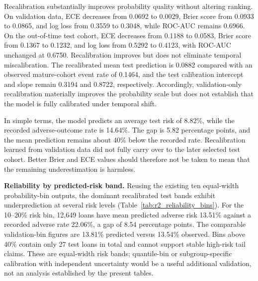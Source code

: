\documentclass[10pt]{article}
\begin{document}
Recalibration substantially improves probability quality without altering ranking. On validation data, ECE decreases from 0.0692 to 0.0029, Brier score from 0.0933 to 0.0865, and log loss from 0.3559 to 0.3048, while ROC-AUC remains 0.6966. On the out-of-time test cohort, ECE decreases from 0.1188 to 0.0583, Brier score from 0.1367 to 0.1232, and log loss from 0.5292 to 0.4123, with ROC-AUC unchanged at 0.6750. Recalibration improves but does not eliminate temporal miscalibration. The recalibrated mean test prediction is 0.0882 compared with an observed mature-cohort event rate of 0.1464, and the test calibration intercept and slope remain 0.3194 and 0.8722, respectively. Accordingly, validation-only recalibration materially improves the probability scale but does not establish that the model is fully calibrated under temporal shift.

In simple terms, the model predicts an average test risk of 8.82\%, while the recorded adverse-outcome rate is 14.64\%. The gap is 5.82 percentage points, and the mean prediction remains about 40\% below the recorded rate. Recalibration learned from validation data did not fully carry over to the later selected test cohort. Better Brier and ECE values should therefore not be taken to mean that the remaining underestimation is harmless.

\noindent\textbf{Reliability by predicted-risk band.} Reusing the existing ten equal-width probability-bin outputs, the dominant recalibrated test bands exhibit underprediction at several risk levels (Table~\ref{tab:r2_reliability_bins}). For the 10--20\% risk bin, 12,649 loans have mean predicted adverse risk 13.51\% against a recorded adverse rate 22.06\%, a gap of 8.54 percentage points. The comparable validation-bin figures are 13.81\% predicted versus 13.54\% observed. Bins above 40\% contain only 27 test loans in total and cannot support stable high-risk tail claims. These are equal-width risk bands; quantile-bin or subgroup-specific calibration with independent uncertainty would be a useful additional validation, not an analysis established by the present tables.
\end{document}
